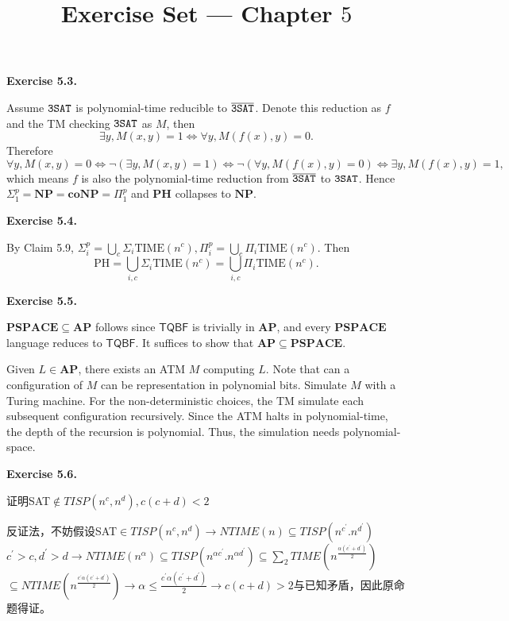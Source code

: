 \documentclass[a4paper]{article}
\title{Exercise Set --- Chapter $5$}
\date{}
\newenvironment{exercise}[1]{
	\par
	\noindent\textbf{Exercise #1.}\quad
}{
	\par
	\bigskip
}
\newcommand{\pbra}[1]{\left( #1 \right)}
\begin{document}
\maketitle

\begin{exercise}{5.3}
    Assume $\tt 3SAT$ is polynomial-time reducible to $\overline{\tt 3SAT}$. Denote this reduction as $f$ and the TM checking
    $\tt 3SAT$ as $M$, then
    $$
    \exists y,M(x,y)=1\iff \forall y,M(f(x),y)=0.
    $$
    Therefore
    $$
    \forall y,M(x,y)=0\iff\neg\pbra{\exists y,M(x,y)=1}\iff\neg\pbra{\forall y,M(f(x),y)=0}\iff\exists y,M(f(x),y)=1,
    $$
    which means $f$ is also the polynomial-time reduction from $\overline{\tt 3SAT}$ to $\tt 3SAT$.
    Hence $\Sigma_1^p=\mathbf{NP}=\mathbf{coNP}=\Pi_1^p$ and $\mathbf{PH}$ collapses to $\mathbf{NP}$.
\end{exercise}

\begin{exercise}{5.4}
    By Claim 5.9, $\Sigma_i^p=\bigcup_c\Sigma_i\text{TIME}(n^c),\Pi_i^p=\bigcup_c\Pi_i\text{TIME}(n^c)$.
    Then 
    $$
    \text{PH}=\bigcup_{i,c}\Sigma_i\text{TIME}(n^c)=\bigcup_{i,c}\Pi_i\text{TIME}(n^c).
    $$
\end{exercise}

\begin{exercise}{5.5}
    $\mathbf{PSPACE} \subseteq \mathbf{AP}$ follows since $\mathsf{TQBF}$ is trivially in $\mathbf{AP}$, and every $\mathbf{PSPACE}$ language reduces to $\mathsf{TQBF}$. It suffices to show that $\mathbf{AP} \subseteq \mathbf{PSPACE}$.

    Given $L \in \mathbf{AP}$, there exists an ATM $M$ computing $L$. Note that can a configuration of $M$ can be representation in polynomial bits. Simulate $M$ with a Turing machine. For the non-deterministic choices, the TM simulate each subsequent configuration recursively. Since the ATM halts in polynomial-time, the depth of the recursion is polynomial. Thus, the simulation needs polynomial-space.
\end{exercise}

\begin{exercise}{5.6}
    证明SAT$\notin TISP(n^c,n^d),c(c+d)<2$

    反证法，不妨假设SAT$\in TISP(n^c,n^d)\to NTIME(n)\subseteq TISP(n^{c^{'}}.n^{d^{'}})$$c^{'}>c,d^{'}>d\to NTIME(n^\alpha)\subseteq TISP(n^{\alpha c^{'}}.n^{\alpha d^{'}})\subseteq \sum_2TIME(n^{\frac{\alpha(c^{'}+d^{'})}{2}})$$\subseteq NTIME(n^{\frac{c^{'}\alpha(c^{'}+d^{'})}{2}})\to \alpha \le \frac{c^{'}\alpha(c^{'}+d^{'}) }{2}\to c(c+d)>2$与已知矛盾，因此原命题得证。
\end{exercise}
\end{document}
